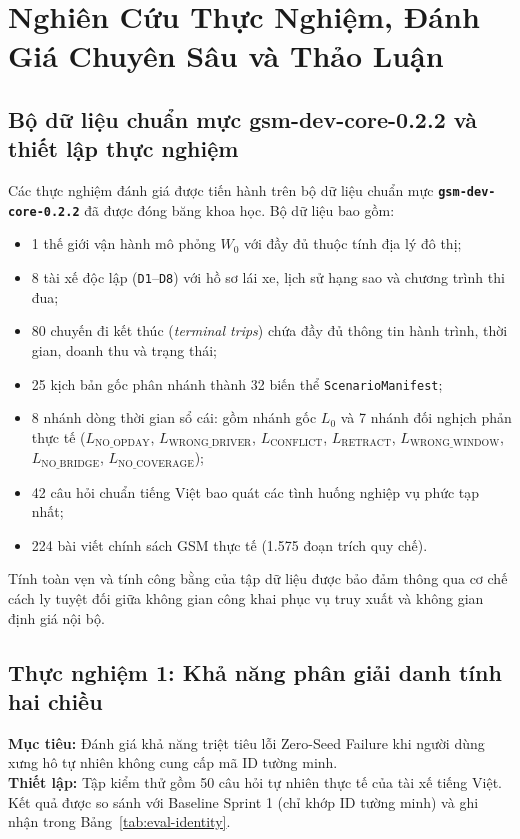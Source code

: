 \documentclass[a4paper,11pt]{article}
\begin{document}
\section{Nghiên Cứu Thực Nghiệm, Đánh Giá Chuyên Sâu và Thảo Luận}
\label{sec:experiments}

\subsection{Bộ dữ liệu chuẩn mực gsm-dev-core-0.2.2 và thiết lập thực nghiệm}
\label{sec:dataset-setup}
Các thực nghiệm đánh giá được tiến hành trên bộ dữ liệu chuẩn mực \textbf{\texttt{gsm-dev-core-0.2.2}} đã được đóng băng khoa học. Bộ dữ liệu bao gồm:
\begin{itemize}[leftmargin=1.5em,noitemsep]
    \item 1 thế giới vận hành mô phỏng $W_0$ với đầy đủ thuộc tính địa lý đô thị;
    \item 8 tài xế độc lập (\texttt{D1}--\texttt{D8}) với hồ sơ lái xe, lịch sử hạng sao và chương trình thi đua;
    \item 80 chuyến đi kết thúc (\textit{terminal trips}) chứa đầy đủ thông tin hành trình, thời gian, doanh thu và trạng thái;
    \item 25 kịch bản gốc phân nhánh thành 32 biến thể \texttt{ScenarioManifest};
    \item 8 nhánh dòng thời gian sổ cái: gồm nhánh gốc $L_0$ và 7 nhánh đối nghịch phản thực tế ($L_{\text{NO\_OPDAY}}$, $L_{\text{WRONG\_DRIVER}}$, $L_{\text{CONFLICT}}$, $L_{\text{RETRACT}}$, $L_{\text{WRONG\_WINDOW}}$, $L_{\text{NO\_BRIDGE}}$, $L_{\text{NO\_COVERAGE}}$);
    \item 42 câu hỏi chuẩn tiếng Việt bao quát các tình huống nghiệp vụ phức tạp nhất;
    \item 224 bài viết chính sách GSM thực tế (1.575 đoạn trích quy chế).
\end{itemize}

Tính toàn vẹn và tính công bằng của tập dữ liệu được bảo đảm thông qua cơ chế cách ly tuyệt đối giữa không gian công khai phục vụ truy xuất và không gian định giá nội bộ.

\subsection{Thực nghiệm 1: Khả năng phân giải danh tính hai chiều}
\label{sec:eval-identity}
\textbf{Mục tiêu:} Đánh giá khả năng triệt tiêu lỗi Zero-Seed Failure khi người dùng xưng hô tự nhiên không cung cấp mã ID tường minh.\\
\textbf{Thiết lập:} Tập kiểm thử gồm 50 câu hỏi tự nhiên thực tế của tài xế tiếng Việt. Kết quả được so sánh với Baseline Sprint 1 (chỉ khớp ID tường minh) và ghi nhận trong Bảng~\ref{tab:eval-identity}.
\end{document}
